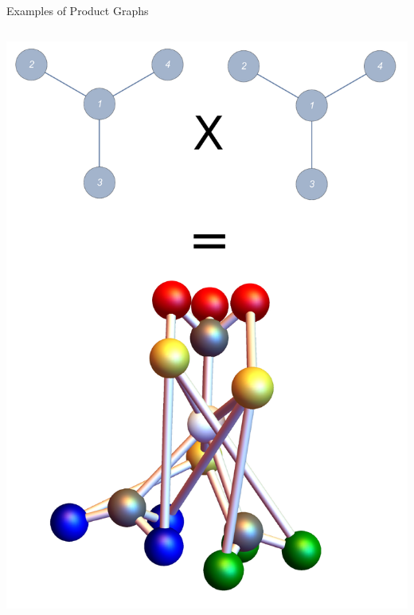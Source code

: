 \documentclass{beamer}
\begin{document}
\begin{frame}{Examples of Product Graphs}
\begin{columns}[T]
{\begin{column}{0.33\textwidth}
     		\includegraphics[trim=30mm 0 0 0, width=\textwidth]{Images/graphprod_switch_square}
		\end{column}}
	\end{columns}
\end{frame}
\end{document}
